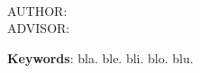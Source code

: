 \begin{resumo}[ABSTRACT]
\vspace{2em}
\begin{center}

\textbf{\expandafter\MakeUppercase\expandafter{\imprimirtituloestrangeiro}}\\
AUTHOR: \imprimirautor\\
ADVISOR: \imprimirorientador
\end{center}
\vspace{1em}
\lipsum[1]

\vspace{2em}
\textbf{Keywords}: bla. ble. bli. blo. blu.
\end{resumo}